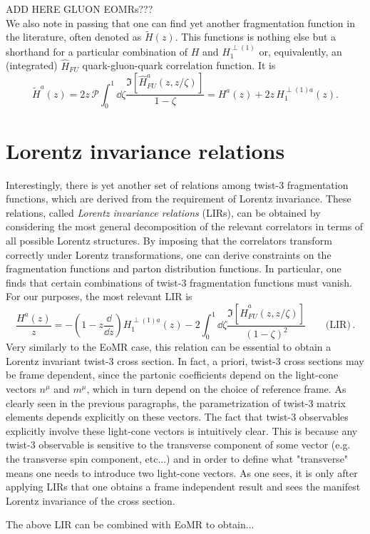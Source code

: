 \noindent ADD HERE GLUON EOMRs???\\

\noindent We also note in passing that one can find yet another fragmentation function in the literature, often denoted as $\tilde H(z)$. This functions is nothing else but a shorthand for a particular combination of $H$ and $H_1^{\perp(1)}$ or, equivalently, an (integrated) $\hat H_{FU}$ quark-gluon-quark correlation function. It is
\begin{equation}\label{eq:Htildedefinition}
    \tilde{H}^a(z)=2z\,\mathcal{P}\int_0^1\dd \zeta\frac{\Im[\hat H^a_{FU}(z,z/\zeta)]}{1-\zeta}=H^a(z)+2z\,H_1^{\perp(1)a}(z).
\end{equation}
\section{Lorentz invariance relations}
Interestingly, there is yet another set of relations among twist-3 fragmentation functions, which are derived from the requirement of Lorentz invariance. These relations, called \textit{Lorentz invariance relations} (LIRs), can be obtained by considering the most general decomposition of the relevant correlators in terms of all possible Lorentz structures. By imposing that the correlators transform correctly under Lorentz transformations, one can derive constraints on the fragmentation functions and parton distribution functions. In particular, one finds that certain combinations of twist-3 fragmentation functions must vanish. For our purposes, the most relevant LIR is \cite{kanazawa_operator_2016}
\begin{equation}
    \frac{H^a(z)}{z}=-\left(1-z\frac{\dd}{\dd z}\right)H_1^{\perp(1)a}(z)-2\int_0^1 \dd \zeta\frac{\Im[\hat H^a_{FU}(z,z/\zeta)]}{\left(1-\zeta\right)^2}\qquad \text{(LIR)}\,.
\end{equation}
Very similarly to the EoMR case, this relation can be essential to obtain a Lorentz invariant twist-3 cross section. In fact, a priori, twist-3 cross sections may be frame dependent, since the partonic coefficients depend on the light-cone vectors $n^\mu$ and $m^\mu$, which in turn depend on the choice of reference frame. As clearly seen in the previous paragraphs, the parametrization of twist-3 matrix elements depends explicitly on these vectors. The fact that twist-3 observables explicitly involve these light-cone vectors is intuitively clear. This is because any twist-3 observable is sensitive to the transverse component of some vector (e.g. the transverse spin component, etc...) and in order to define what "transverse" means one needs to introduce two light-cone vectors. As one sees, it is only after applying LIRs that one obtains a frame independent result and sees the manifest Lorentz invariance of the cross section. 

The above LIR can be combined with EoMR to obtain...